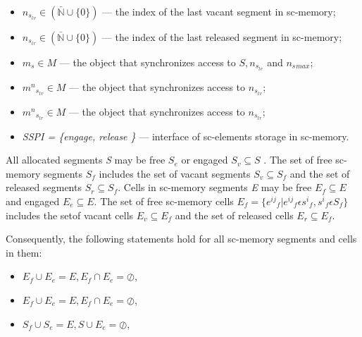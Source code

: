 \documentclass{scndocument}
\begin{document}
\begin{SCn}
\begin{multicols}{2}
\begin{itemize}
\item $n_{s_l{}_v} \in (\bar{\mathbb{N}} \cup \{0\})$  — the index of the last vacant segment in sc-memory;
\item $n_{s_l{}_r} \in (\bar{\mathbb{N}} \cup \{ 0 \})$  — the index of the last released segment in sc-memory;
\item $m_s \in M$  — the object that synchronizes access to $S, n_{s_l{}_e}$  and $n_s{}_{max}$;
\item  $m^n {_{s_l{}_v}} \in M$  — the object that synchronizes access to  $n_{s_l{}_v}$;
\item  $m^n{_{s_l{}_r}} \in M$ — the object that synchronizes access to  $n_{s_l{}_r}$;
\item \textit{SSPI = \{engage, release \}} — interface of sc-elements storage in sc-memory.
\end{itemize}
\justifying All allocated segments \textit{S} may be free \textit{$S_e$} or engaged \textit{$S_v \subseteq S$} . The set of free sc-memory segments \textit{${S_f}$} includes the set of vacant segments \textit{${S_v}\subseteq {S_f}$}  and the set of released segments \textit{${S_r} \subseteq {S_f}$}.
\justifying 
Cells in sc-memory segments  \textit{E} may be free {${E_f}\subseteq {E}$} and engaged \textit{${E_e}\subseteq {E}$}.  The set of free sc-memory cells $E_f = \{{e^{ij}{_{f}}} | {e^{ij}{_{f}}  \epsilon s^i{_f} ,  s^i{_f}  \epsilon  S_f \}}$ includes the setof vacant cells $E_v \subseteq E_f$ and the set of released cells $ E_r \subseteq E_f.$


Consequently, the following statements hold for all sc-memory segments and cells in them:
\begin{itemize} 


\item \textit {$E_f \cup  E_e = E, E_f \cap  E_e  = \oslash$},

\item \textit {$E_f \cup  E_e = E, E_f \cap  E_e = \oslash$},

\item \textit {$S_f \cup  S_e = E, S \cup  E_e = \oslash$},


\end{itemize}
\end{multicols}
\end{SCn}
\end{document}
